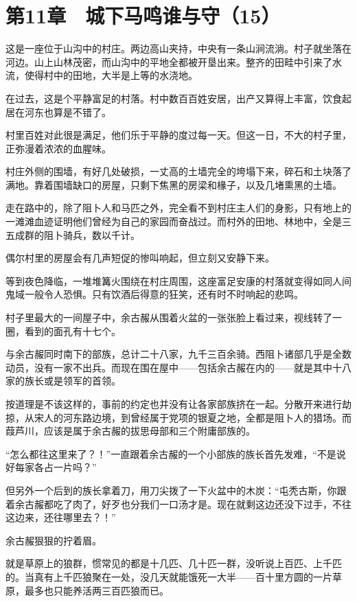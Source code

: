\section{第11章　城下马鸣谁与守（15）}

这是一座位于山沟中的村庄。两边高山夹持，中央有一条山涧流淌。村子就坐落在河边。山上山林茂密，而山沟中的平地全都被开垦出来。整齐的田畦中引来了水流，使得村中的田地，大半是上等的水浇地。

在过去，这是个平静富足的村落。村中数百百姓安居，出产又算得上丰富，饮食起居在河东也算是不错了。

村里百姓对此很是满足，他们乐于平静的度过每一天。但这一日，不大的村子里，正弥漫着浓浓的血腥味。

村庄外侧的围墙，有好几处破损，一丈高的土墙完全的垮塌下来，碎石和土块落了满地。靠着围墙缺口的房屋，只剩下焦黑的房梁和椽子，以及几堵熏黑的土墙。

走在路中的，除了阻卜人和马匹之外，完全看不到村庄主人们的身影，只有地上的一滩滩血迹证明他们曾经为自己的家园而奋战过。而村外的田地、林地中，全是三五成群的阻卜骑兵，数以千计。

偶尔村里的房屋会有几声短促的惨叫响起，但立刻又安静下来。

等到夜色降临，一堆堆篝火围绕在村庄周围，这座富足安康的村落就变得如同人间鬼域一般令人恐惧。只有饮酒后得意的狂笑，还有时不时响起的悲鸣。

村子里最大的一间屋子中，余古赧从围着火盆的一张张脸上看过来，视线转了一圈，看到的面孔有十七个。

与余古赧同时南下的部族，总计二十八家，九千三百余骑。西阻卜诸部几乎是全数动员，没有一家不出兵。而现在围在屋中——包括余古赧在内的——就是其中十八家的族长或是领军的首领。

按道理是不该这样的，事前的约定也并没有让各家部族挤在一起。分散开来进行劫掠，从宋人的河东路边境，到曾经属于党项的银夏之地，全都是阻卜人的猎场。而葭芦川，应该是属于余古赧的拔思母部和三个附庸部族的。

“怎么都往这里来了？！”一直跟着余古赧的一个小部族的族长首先发难，“不是说好每家各占一片吗？”

但另外一个后到的族长拿着刀，用刀尖拨了一下火盆中的木炭：“屯秃古斯，你跟着余古赧都吃了肉了，好歹也分我们一口汤才是。现在就剩这边还没下过手，不往这边来，还往哪里去？！”

余古赧狠狠的拧着眉。

就是草原上的狼群，惯常见的都是十几匹、几十匹一群，没听说上百匹、上千匹的。当真有上千匹狼聚在一处，没几天就能饿死一大半——百十里方圆的一片草原，最多也只能养活两三百匹狼而已。

